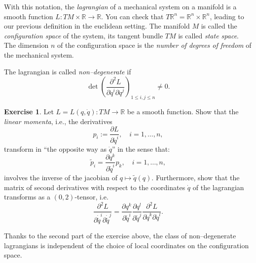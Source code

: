 \documentclass[english,fontsize=11pt,paper=b5]{scrbook}
\theoremstyle{definition}
\newtheorem{exercise}{Exercise}[chapter]
\begin{document}
    With this notation, the \emph{lagrangian} of a mechanical system on a manifold is a smooth function $L : TM\times\mathbb{R} \to \mathbb{R}$.
    You can check that $T\mathbb{R}^n = \mathbb{R}^n \times \mathbb{R}^n$, leading to our previous definition in the euclidean setting.
    The manifold $M$ is called the \emph{configuration space} of the system, its tangent bundle $TM$ is called \emph{state space}. The dimension $n$ of the configuration space is the \emph{number of degrees of freedom} of the mechanical system.

    The lagrangian is called \emph{non--degenerate} if
    \begin{equation}
      \det %
      \left(\frac{\partial^2 L}{\partial \dot{q}^i \partial \dot{q}^j}\right)_{1\leq i,j\leq n}
      \neq 0.
    \end{equation}

    \begin{exercise}\label{exe:coordinatesInd}
      Let $L=L(q,\dot q):TM \to \mathbb{R}$ be a smooth function. Show that the \emph{linear momenta}, i.e., the derivatives
      \begin{equation}
        p_i := \frac{\partial L}{\partial \dot q^i}, \quad i=1,\ldots,n,
      \end{equation}
      transform in ``the opposite way as $\dot q$'' in the sense that:
      \begin{equation}
        \widetilde p_i = \frac{\partial q^k}{\partial {\widetilde q}^i} p_k, \quad i=1,\ldots,n,
      \end{equation}
      involves the inverse of the jacobian of $q\mapsto \widetilde q(q)$.
      Furthermore, show that the matrix of second derivatives with respect to the coordinates $\dot q$ of the lagrangian transforms as a $(0,2)$-tensor, i.e.
      \begin{equation}
        \frac{\partial^2 L}{\partial \dot{\widetilde q}^i \partial \dot{\widetilde q}^j} =
        \frac{\partial q^k}{\partial {\widetilde q}^i}\frac{\partial q^l}{\partial {\widetilde q}^j}
        \frac{\partial^2 L}{\partial \dot{q}^k \partial \dot{q}^l}.
      \end{equation}
    \end{exercise}
    Thanks to the second part of the exercise above, the class of non--degenerate lagrangians is independent of the choice of local coordinates on the configuration space.
\end{document}
